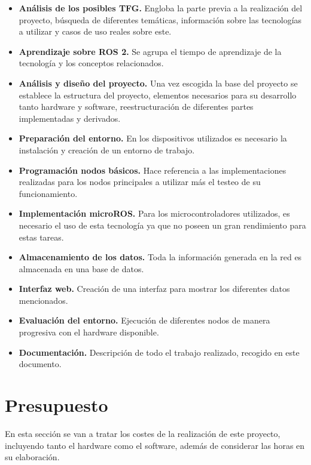 \begin{itemize}
    \item \textbf{Análisis de los posibles TFG.} Engloba la parte previa a la realización del proyecto, búsqueda de diferentes temáticas, información sobre las tecnologías a utilizar y casos de uso reales sobre este.
    \item \textbf{Aprendizaje sobre ROS 2.} Se agrupa el tiempo de aprendizaje de la tecnología y los conceptos relacionados.
    \item \textbf{Análisis y diseño del proyecto.} Una vez escogida la base del proyecto se establece la estructura del proyecto, elementos necesarios para su desarrollo tanto hardware y software, reestructuración de diferentes partes implementadas y derivados.
    \item \textbf{Preparación del entorno.} En los dispositivos utilizados es necesario la instalación y creación de un entorno de trabajo.
    \item \textbf{Programación nodos básicos.} Hace referencia a las implementaciones realizadas para los nodos principales a utilizar más el testeo de su funcionamiento.
    \item \textbf{Implementación microROS.} Para los microcontroladores utilizados, es necesario el uso de esta tecnología ya que no poseen un gran rendimiento para estas tareas.
    \item \textbf{Almacenamiento de los datos.} Toda la información generada en la red es almacenada en una base de datos.
    \item \textbf{Interfaz web.} Creación de una interfaz para mostrar los diferentes datos mencionados.
    \item \textbf{Evaluación del entorno.} Ejecución de diferentes nodos de manera progresiva con el hardware disponible.
    \item \textbf{Documentación.} Descripción de todo el trabajo realizado, recogido en este documento.
\end{itemize}

\section{Presupuesto}

En esta sección se van a tratar los costes de la realización de este proyecto, incluyendo tanto el hardware como el software, además de considerar las horas en su elaboración.


